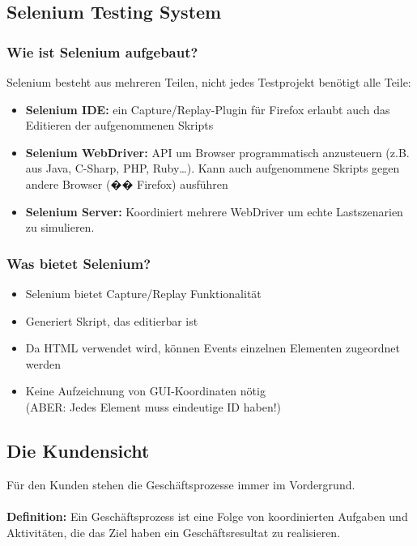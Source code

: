 \documentclass[a4paper,10pt]{article}
\newcommand{\Bold}[1]{\textbf{#1}} %
\begin{document}
\subsection{Selenium Testing System}
\subsubsection{Wie ist Selenium aufgebaut?}
Selenium besteht aus mehreren Teilen, nicht jedes Testprojekt ben\"otigt alle Teile:
\begin{itemize}
\item \textbf{\Bold Selenium IDE:} ein Capture/Replay-Plugin für Firefox erlaubt auch das Editieren der aufgenommenen Skripts
\item \textbf{\Bold Selenium WebDriver:} API um Browser programmatisch anzusteuern (z.B. aus Java, C-Sharp, PHP, Ruby…). Kann auch aufgenommene Skripts gegen andere Browser (��  Firefox) ausführen
\item \textbf{\Bold Selenium Server:} Koordiniert mehrere WebDriver um echte Lastszenarien zu simulieren.

\end{itemize}

\subsubsection{Was bietet Selenium?}
\begin{itemize}
\item Selenium bietet Capture/Replay Funktionalit\"at
\item Generiert Skript, das editierbar ist
\item Da HTML verwendet wird, k\"onnen Events einzelnen Elementen zugeordnet werden
\item Keine Aufzeichnung von GUI-Koordinaten n\"otig\\
(ABER: Jedes Element muss eindeutige ID haben!)
\end{itemize}

\subsection{Die Kundensicht}
Für den Kunden stehen die Gesch\"aftsprozesse immer im Vordergrund.\\\\
\textbf{\Bold Definition:} Ein Gesch\"aftsprozess ist eine Folge von koordinierten Aufgaben und Aktivit\"aten, die das Ziel haben ein Gesch\"aftsresultat zu realisieren.
\end{document}
